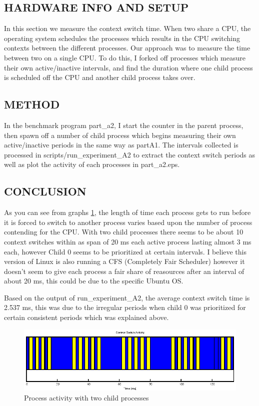 \documentclass{article}
\begin{document}
\subsection{HARDWARE INFO AND SETUP}

In this section we measure the context switch time. When two share a CPU, the operating system schedules the processes which results in the CPU switching contexts between the different processes. Our approach was to measure the time between two on a single CPU. To do this, I forked off processes which measure their own active/inactive intervals, and find the duration where one child process is scheduled off the CPU and another child process takes over. 

\subsection{METHOD}

In the benchmark program part_a2, I start the counter in the parent process, then spawn off a number of child process which begins measuring their own active/inactive periods in the same way as partA1. The intervals collected is processed in scripts/run\_experiment\_A2 to extract the context switch periods as well as plot the activity of each processes in part\_a2.eps. 

 
\subsection{CONCLUSION}
As you can see from graphs \ref{fig:parta2}, the length of time each process gets to run before it is forced to switch to another process varies based upon the number of process contending for the CPU. With two child processes there seems to be about 10 context switches within as span of 20 ms each active process lasting almost 3 ms each, however Child 0 seems to be prioritized at certain intervals. I believe this version of Linux is also running a CFS (Completely Fair Scheduler) however it doesn't seem to give each process a fair share of reasources after an interval of about 20 ms, this could be due to the specific Ubuntu OS.

Based on the output of run\_experiment\_A2, the average context switch time is 2.537 ms, this was due to the irregular periods when child 0 was prioritized for certain consistent periods which was explained above.

\begin{figure}
\centering
\includegraphics[scale=1.75]{part_a2.eps}
\caption{Process activity with two child processes}
\label{fig:parta2}
\end{figure}
\end{document}
